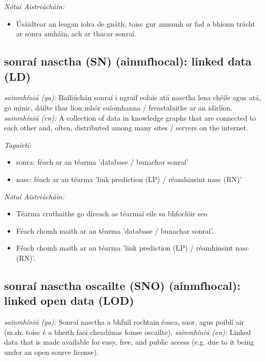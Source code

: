 \documentclass{article}
\begin{document}
 \noindent \textit{Nótaí Aistriúcháin:}
\begin{itemize}
	\item Úsáidtear an leagan iolra de gnáth, toisc gur annamh ar fad a bhíonn trácht ar sonra amháin, ach ar thacar sonraí.
\end{itemize}


\subsection*{sonraí nasctha (SN) (ainmfhocal): linked data (LD)} 
 \noindent \textit{sainmhíniú (ga):} Bailiúchán sonraí i ngraif eolais atá nasctha lena chéile agus atá, go minic, dáilte thar líon mhór suíomhanna / freastalaithe ar an idirlíon.
\newline\newline
 \noindent \textit{sainmhíniú (en):} A collection of data in knowledge graphs that are connected to each other and, often, distributed among many sites / servers on the internet.
\newline

 \noindent \textit{Tagairtí:}
\begin{itemize}
	\item sonra: féach ar an téarma 'database / bunachar sonraí'
	\item nasc: féach ar an téarma 'link prediction (LP) / réamhinsint nasc (RN)'
\end{itemize}

 \noindent \textit{Nótaí Aistriúcháin:}
\begin{itemize}
	\item Téarma cruthaithe go díreach as téarmaí eile sa bhfoclóir seo
	\item Féach chomh maith ar an téarma 'database / bunachar sonraí'.
	\item Féach chomh maith ar an téarma 'link prediction (LP) / réamhinsint nasc (RN)'.
\end{itemize}


\subsection*{sonraí nasctha oscailte (SNO) (ainmfhocal): linked open data (LOD)} 
 \noindent \textit{sainmhíniú (ga):} Sonraí nasctha a bhfuil rochtain éasca, saor, agus poiblí air (m.sh. toisc é a bheith faoi cheadúnas foinse oscailte).
\newline\newline
 \noindent \textit{sainmhíniú (en):} Linked data that is made available for easy, free, and public access (e.g. due to it being under an open source license).
\newline
\end{document}
